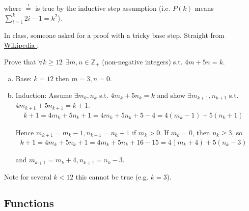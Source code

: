 \documentclass{article}
\begin{document}
\begin{enumerate}
\begin{enumerate}[a)]
\begin{example}
          where $\stackrel{!}{=}$ is true by the inductive step assumption (i.e. $P(k)$ means $\sum^{k}_{i = 1} 2i - 1 = k^2$).
        \end{example}

        In class, someone asked for a proof with a tricky base step. Straight from \href{https://en.wikipedia.org/wiki/Mathematical_induction#Base_case_other_than_0_or_1}{Wikipedia \ExternalLink}:
        \begin{example}
          Prove that $\forall k \ge 12 ~~ \exists m, n \in \mathbb{Z}_+$ (non-negative integers) s.t. $4m + 5n = k$.
          \begin{enumerate}[a)]
            \item Base: $k = 12$ then $m = 3, n = 0$.
            \item Induction: Assume $\exists m_k, n_k$ s.t. $4m_k + 5n_k = k$ and show $\exists m_{k + 1}, n_{k + 1}$ s.t. $4m_{k + 1} + 5n_{k + 1} = k + 1$.
              \begin{align*}
                k + 1
                = 4m_k + 5n_k + 1
                = 4m_k + 5n_k + 5 - 4
                = 4(m_k - 1) + 5(n_k + 1)
              \end{align*}

              Hence $m_{k + 1} = m_k - 1, n_{k + 1} = n_k + 1$ if $m_k > 0$. If $m_k = 0$, then $n_k \ge 3$, so
              \begin{align*}
                k + 1
                = 4m_k + 5n_k + 1
                = 4m_k + 5n_k + 16 - 15
                = 4(m_k + 4) + 5(n_k - 3)
              \end{align*}

              and $m_{k + 1} = m_k + 4, n_{k + 1} = n_k - 3$.
          \end{enumerate}

          Note for several $k < 12$ this cannot be true (e.g. $k = 3$).
        \end{example}
    \end{enumerate}
\end{enumerate}

\subsection{Functions}
\label{sub:functions}
\end{document}
